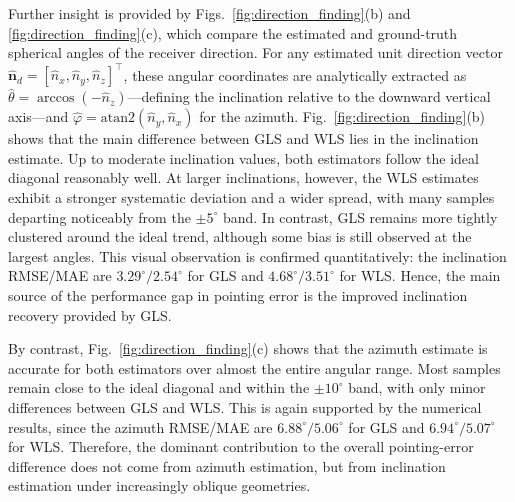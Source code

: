 \documentclass[conference]{IEEEtran}
\begin{document}

Further insight is provided by Figs.~\ref{fig:direction_finding}(b) and \ref{fig:direction_finding}(c), which compare the estimated and ground-truth spherical angles of the receiver direction. For any estimated unit direction vector $\hat{\mathbf{n}}_d = [\hat{n}_{x}, \hat{n}_{y}, \hat{n}_{z}]^\top$, these angular coordinates are analytically extracted as $\hat{\theta} = \arccos(-\hat{n}_{z})$---defining the inclination relative to the downward vertical axis---and $\hat{\varphi} = \mathrm{atan2}(\hat{n}_{y}, \hat{n}_{x})$ for the azimuth. Fig.~\ref{fig:direction_finding}(b) shows that the main difference between GLS and WLS lies in the inclination estimate. Up to moderate inclination values, both estimators follow the ideal diagonal reasonably well. At larger inclinations, however, the WLS estimates exhibit a stronger systematic deviation and a wider spread, with many samples departing noticeably from the $\pm5^\circ$ band. In contrast, GLS remains more tightly clustered around the ideal trend, although some bias is still observed at the largest angles. This visual observation is confirmed quantitatively: the inclination RMSE/MAE are $3.29^\circ/2.54^\circ$ for GLS and $4.68^\circ/3.51^\circ$ for WLS. Hence, the main source of the performance gap in pointing error is the improved inclination recovery provided by GLS.



By contrast, Fig.~\ref{fig:direction_finding}(c) shows that the azimuth estimate is accurate for both estimators over almost the entire angular range. Most samples remain close to the ideal diagonal and within the $\pm10^\circ$ band, with only minor differences between GLS and WLS. This is again supported by the numerical results, since the azimuth RMSE/MAE are $6.88^\circ/5.06^\circ$ for GLS and $6.94^\circ/5.07^\circ$ for WLS. Therefore, the dominant contribution to the overall pointing-error difference does not come from azimuth estimation, but from inclination estimation under increasingly oblique geometries.
\end{document}
